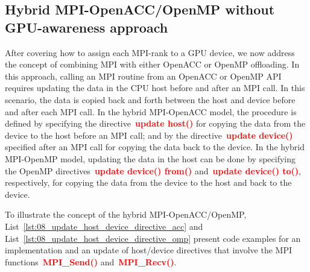




\subsection{Hybrid MPI-OpenACC/OpenMP without GPU-awareness approach}


\par
After covering how to assign each MPI-rank to a GPU device, we now address the concept of combining MPI with either OpenACC or OpenMP offloading.
In this approach, calling an MPI routine from an OpenACC or OpenMP API requires updating the data in the CPU host before and after an MPI call.
In this scenario, the data is copied back and forth between the host and device before and after each MPI call.
In the hybrid MPI-OpenACC model, the procedure is defined by specifying the directive~\textbf{\textcolor{red}{update host()}} for copying the data from the device to the host before an MPI call; and by the directive~\textbf{\textcolor{red}{update device()}} specified after an MPI call for copying the data back to the device.
In the hybrid MPI-OpenMP model, updating the data in the host can be done by specifying the OpenMP directives~\textbf{\textcolor{red}{update device() from()}} and~\textbf{\textcolor{red}{update device() to()}}, respectively, for copying the data from the device to the host and back to the device.


\par
To illustrate the concept of the hybrid MPI-OpenACC/OpenMP, List~\ref{lst:08_update_host_device_directive_acc} and List~\ref{lst:08_update_host_device_directive_omp} present code examples for an implementation and an update of host/device directives that involve the MPI functions~\textbf{\textcolor{red}{MPI\_Send()}} and~\textbf{\textcolor{red}{MPI\_Recv()}}.





